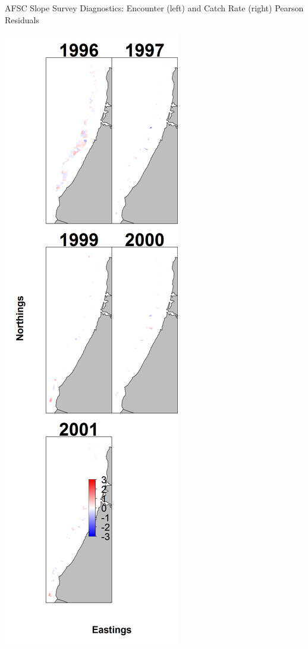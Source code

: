 \documentclass[pdf]{beamer}\usepackage[]{graphicx}\usepackage[]{color}
\begin{document}
\begin{frame}{AFSC Slope Survey Diagnostics: Encounter (left) and Catch Rate (right) Pearson Residuals}
  \begin{center}
  \includegraphics[scale = 0.15]{figures/AFSC_maps--encounter_pearson_resid.png}

\end{center}
\end{frame}
\end{document}
